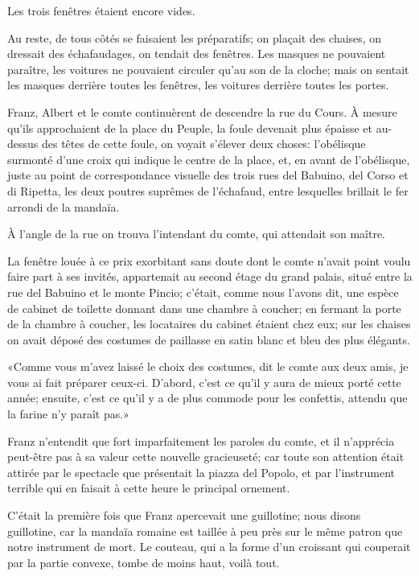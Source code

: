 Les trois fenêtres étaient encore vides. 

Au reste, de tous côtés se faisaient les préparatifs; on plaçait des chaises, on dressait des échafaudages, on tendait des fenêtres. Les masques ne pouvaient paraître, les voitures ne pouvaient circuler qu'au son de la cloche; mais on sentait les masques derrière toutes les fenêtres, les voitures derrière toutes les portes.  

Franz, Albert et le comte continuèrent de descendre la rue du Cours. À mesure qu'ils approchaient de la place du Peuple, la foule devenait plus épaisse et au-dessus des têtes de cette foule, on voyait s'élever deux choses: l'obélisque surmonté d'une croix qui indique le centre de la place, et, en avant de l'obélisque, juste au point de correspondance visuelle des trois rues del Babuino, del Corso et di Ripetta, les deux poutres suprêmes de l'échafaud, entre lesquelles brillait le fer arrondi de la mandaïa. 

À l'angle de la rue on trouva l'intendant du comte, qui attendait son maître. 

La fenêtre louée à ce prix exorbitant sans doute dont le comte n'avait point voulu faire part à ses invités, appartenait au second étage du grand palais, situé entre la rue del Babuino et le monte Pincio; c'était, comme nous l'avons dit, une espèce de cabinet de toilette donnant dans une chambre à coucher; en fermant la porte de la chambre à coucher, les locataires du cabinet étaient chez eux; sur les chaises on avait déposé des costumes de paillasse en satin blanc et bleu des plus élégants. 

«Comme vous m'avez laissé le choix des costumes, dit le comte aux deux amis, je vous ai fait préparer ceux-ci. D'abord, c'est ce qu'il y aura de mieux porté cette année; ensuite, c'est ce qu'il y a de plus commode pour les confettis, attendu que la farine n'y paraît pas.» 

Franz n'entendit que fort imparfaitement les paroles du comte, et il n'apprécia peut-être pas à sa valeur cette nouvelle gracieuseté; car toute son attention était attirée par le spectacle que présentait la piazza del Popolo, et par l'instrument terrible qui en faisait à cette heure le principal ornement. 

C'était la première fois que Franz apercevait une guillotine; nous disons guillotine, car la mandaïa romaine est taillée à peu près sur le même patron que notre instrument de mort. Le couteau, qui a la forme d'un croissant qui couperait par la partie convexe, tombe de moins haut, voilà tout. 

